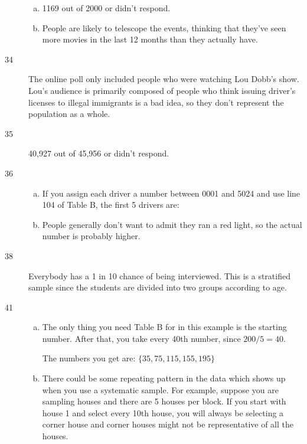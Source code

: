 \documentclass[letterpaper, landscape]{exam}
\begin{document}
\begin{description}
\begin{enumerate}[(a)]
          \item 1169 out of 2000 or  didn't respond.

          \item People are likely to telescope the events, thinking that they've
            seen more movies in the last 12 months than they actually have.
        \end{enumerate}

      \item[34] The online poll only included people who were watching Lou
        Dobb's show.  Lou's audience is primarily composed of people who think
        issuing driver's licenses to illegal immigrants is a bad idea, so they
        don't represent the population as a whole.

      \item[35] 40,927 out of 45,956 or  didn't respond.

      \item[36] 
        \begin{enumerate}[(a)]
          \item If you assign each driver a number between 0001 and 5024 and use
            line 104 of Table B, the first 5 drivers are: 
          

          \item People generally don't want to admit they ran a red light, so
            the actual number is probably higher.
        \end{enumerate}

      \item[38] Everybody has a 1 in 10 chance of being interviewed.  This is a
        stratified sample since the students are divided into two groups
        according to age.

      \item[41] 
        \begin{enumerate}[(a)]
          \item The only thing you need Table B for in this example is the
          starting number.  After that, you take every 40th number, since
          $200/5 = 40$. 
          
          The numbers you get are: $\boxed{ \{35, 75, 115, 155, 195 \} }$

          \item There could be some repeating pattern in the data which shows up
          when you use a systematic sample.  For example, suppose you are
          sampling houses and there are 5 houses per block.  If you start with
          house 1 and select every 10th house, you will always be selecting a
          corner house and corner houses might not be representative of all the
          houses.
        \end{enumerate}


\end{description}
\end{document}
